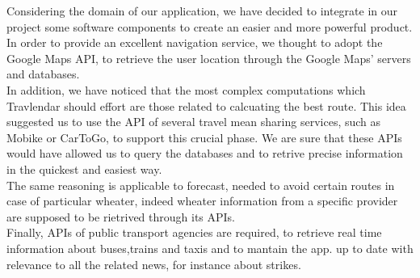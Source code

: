 
	Considering the domain of our application, we have decided to integrate in our project some software components to create an easier and more powerful product. 
	\\In order to provide an excellent navigation service, we thought to adopt the Google Maps API, to retrieve the user location through the Google Maps' servers and databases. 
	\\In addition, we have noticed that the most complex computations which Travlendar should effort are those related to calcuating the best route. This idea suggested us to use the API of several travel mean sharing services, such as Mobike or CarToGo, 
	to support this crucial phase. We are sure that these APIs would have allowed us to query the databases and to retrive precise information in the quickest and easiest way.
	\\The same reasoning is applicable to forecast, needed to avoid certain routes in case of particular wheater, indeed wheater information from a specific provider are supposed to be rietrived through its APIs. 
	\\Finally, APIs of public transport agencies are required, to retrieve real time information about buses,trains and taxis and to mantain the app. up to date with relevance to all the related news, for instance about strikes. 
	
